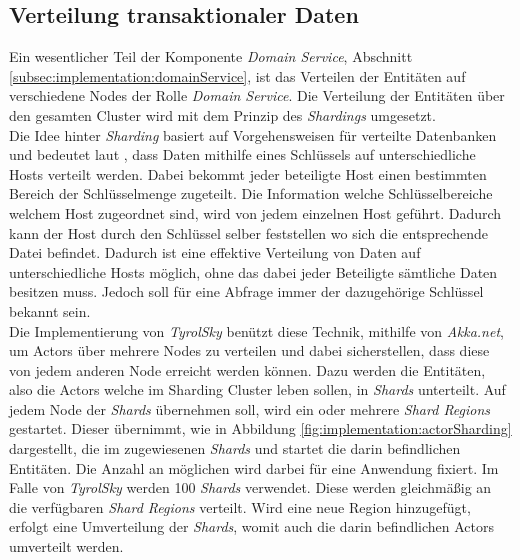 \subsection{Verteilung transaktionaler Daten}
\label{subsec:implementation:akkaSharding}
Ein wesentlicher Teil der Komponente \textit{Domain Service}, Abschnitt \ref{subsec:implementation:domainService}, ist das Verteilen der Entitäten auf verschiedene Nodes der Rolle \textit{Domain Service}. Die Verteilung der Entitäten über den gesamten Cluster wird mit dem Prinzip des \textit{Shardings} umgesetzt. \\
Die Idee hinter \textit{Sharding} basiert auf Vorgehensweisen für verteilte Datenbanken und bedeutet laut \cite{shardingCattell}, dass Daten mithilfe eines Schlüssels auf unterschiedliche Hosts verteilt werden. Dabei bekommt jeder beteiligte Host einen bestimmten Bereich der Schlüsselmenge zugeteilt.
Die Information welche Schlüsselbereiche welchem Host zugeordnet sind, wird von jedem einzelnen Host geführt. Dadurch kann der Host durch den Schlüssel selber feststellen wo sich die entsprechende Datei befindet.
Dadurch ist eine effektive Verteilung von Daten auf unterschiedliche Hosts möglich, ohne das dabei jeder Beteiligte sämtliche Daten besitzen muss. Jedoch soll für eine Abfrage immer der dazugehörige Schlüssel bekannt sein. \\
Die Implementierung von \textit{TyrolSky} benützt diese Technik, mithilfe von \textit{Akka.net}, um Actors über mehrere Nodes zu verteilen und dabei sicherstellen, dass diese von jedem anderen Node erreicht werden können. Dazu werden die Entitäten, also die Actors welche im Sharding Cluster leben sollen, in \textit{Shards} unterteilt. Auf jedem Node der \textit{Shards} übernehmen soll, wird ein oder mehrere \textit{Shard Regions} gestartet. Dieser übernimmt, wie in Abbildung \ref{fig:implementation:actorSharding} dargestellt, die im zugewiesenen \textit{Shards} und startet die darin befindlichen Entitäten. Die Anzahl an möglichen  wird darbei für eine Anwendung fixiert. Im Falle von \textit{TyrolSky} werden {100} \textit{Shards} verwendet. Diese werden gleichmäßig an die verfügbaren \textit{Shard Regions} verteilt. Wird eine neue Region hinzugefügt, erfolgt eine Umverteilung der \textit{Shards}, womit auch die darin befindlichen Actors umverteilt werden. 

